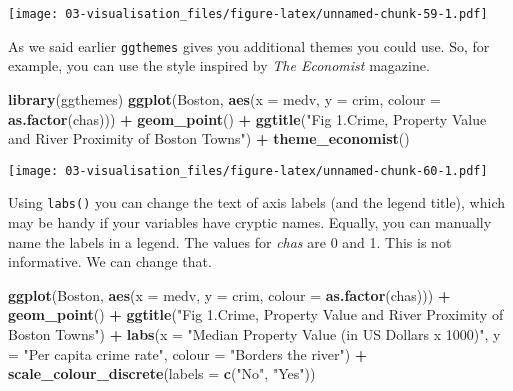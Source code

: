 \documentclass[
]{book}
\newenvironment{Shaded}{\begin{snugshade}}{\end{snugshade}}
\newcommand{\AttributeTok}[1]{\textcolor[rgb]{0.13,0.29,0.53}{#1}}
\newcommand{\FunctionTok}[1]{\textcolor[rgb]{0.13,0.29,0.53}{\textbf{#1}}}
\newcommand{\NormalTok}[1]{#1}
\newcommand{\SpecialCharTok}[1]{\textcolor[rgb]{0.81,0.36,0.00}{\textbf{#1}}}
\newcommand{\StringTok}[1]{\textcolor[rgb]{0.31,0.60,0.02}{#1}}
\begin{document}
\texttt{[image: 03-visualisation\_files/figure-latex/unnamed-chunk-59-1.pdf]}

As we said earlier \texttt{ggthemes} gives you additional themes you could use. So, for example, you can use the style inspired by \emph{The Economist} magazine.

\begin{Shaded}
\begin{Highlighting}[]
\FunctionTok{library}\NormalTok{(ggthemes)}
\FunctionTok{ggplot}\NormalTok{(Boston, }\FunctionTok{aes}\NormalTok{(}\AttributeTok{x =}\NormalTok{ medv, }\AttributeTok{y =}\NormalTok{ crim, }\AttributeTok{colour =} \FunctionTok{as.factor}\NormalTok{(chas))) }\SpecialCharTok{+}
  \FunctionTok{geom\_point}\NormalTok{() }\SpecialCharTok{+}
  \FunctionTok{ggtitle}\NormalTok{(}\StringTok{"Fig 1.Crime, Property Value and River Proximity of Boston Towns"}\NormalTok{) }\SpecialCharTok{+}
  \FunctionTok{theme\_economist}\NormalTok{()}
\end{Highlighting}
\end{Shaded}

\texttt{[image: 03-visualisation\_files/figure-latex/unnamed-chunk-60-1.pdf]}

Using \texttt{labs()} you can change the text of axis labels (and the legend title), which may be handy if your variables have cryptic names. Equally, you can manually name the labels in a legend. The values for \emph{chas} are 0 and 1. This is not informative. We can change that.

\begin{Shaded}
\begin{Highlighting}[]
\FunctionTok{ggplot}\NormalTok{(Boston, }\FunctionTok{aes}\NormalTok{(}\AttributeTok{x =}\NormalTok{ medv, }\AttributeTok{y =}\NormalTok{ crim, }\AttributeTok{colour =} \FunctionTok{as.factor}\NormalTok{(chas))) }\SpecialCharTok{+}
  \FunctionTok{geom\_point}\NormalTok{() }\SpecialCharTok{+}
  \FunctionTok{ggtitle}\NormalTok{(}\StringTok{"Fig 1.Crime, Property Value and River Proximity of Boston Towns"}\NormalTok{) }\SpecialCharTok{+}
  \FunctionTok{labs}\NormalTok{(}\AttributeTok{x =} \StringTok{"Median Property Value (in US Dollars x 1000)"}\NormalTok{,}
       \AttributeTok{y =} \StringTok{"Per capita crime rate"}\NormalTok{,}
       \AttributeTok{colour =} \StringTok{"Borders the river"}\NormalTok{) }\SpecialCharTok{+}
  \FunctionTok{scale\_colour\_discrete}\NormalTok{(}\AttributeTok{labels =} \FunctionTok{c}\NormalTok{(}\StringTok{"No"}\NormalTok{, }\StringTok{"Yes"}\NormalTok{))}
\end{Highlighting}
\end{Shaded}
\end{document}
